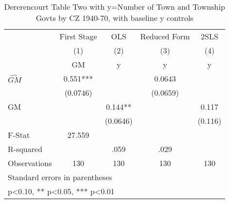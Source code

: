 \begin{table}[htbp]\centering
\def\sym#1{\ifmmode^{#1}\else\(^{#1}\)\fi}
\caption{Dererencourt Table Two with y=Number of Town and Township Govts by CZ 1940-70, with baseline y controls}
\begin{tabular}{l*{4}{c}}
\toprule
                    & First Stage   &         OLS   &Reduced Form   &        2SLS   \\
                    &\multicolumn{1}{c}{(1)}&\multicolumn{1}{c}{(2)}&\multicolumn{1}{c}{(3)}&\multicolumn{1}{c}{(4)}\\
                    &\multicolumn{1}{c}{GM}&\multicolumn{1}{c}{y}&\multicolumn{1}{c}{y}&\multicolumn{1}{c}{y}\\
\midrule
$\hat{GM}$          &       0.551***&               &      0.0643   &               \\
                    &    (0.0746)   &               &    (0.0659)   &               \\
\addlinespace
GM                  &               &       0.144** &               &       0.117   \\
                    &               &    (0.0646)   &               &     (0.116)   \\
\midrule
F-Stat              &      27.559   &               &               &               \\
R-squared           &               &        .059   &        .029   &               \\
Observations        &         130   &         130   &         130   &         130   \\
\bottomrule
\multicolumn{5}{l}{\footnotesize Standard errors in parentheses}\\
\multicolumn{5}{l}{\footnotesize * p<0.10, ** p<0.05, *** p<0.01}\\
\end{tabular}
\end{table}
